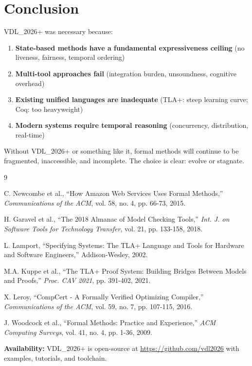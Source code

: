 \documentclass[11pt]{article}
\begin{document}
\section{Conclusion}

VDL\_2026+ was necessary because:

\begin{enumerate}
\item \textbf{State-based methods have a fundamental expressiveness ceiling} (no liveness, fairness, temporal ordering)
\item \textbf{Multi-tool approaches fail} (integration burden, unsoundness, cognitive overhead)
\item \textbf{Existing unified languages are inadequate} (TLA+: steep learning curve; Coq: too heavyweight)
\item \textbf{Modern systems require temporal reasoning} (concurrency, distribution, real-time)
\end{enumerate}

Without VDL\_2026+ or something like it, formal methods will continue to be fragmented, inaccessible, and incomplete. The choice is clear: evolve or stagnate.

\begin{thebibliography}{9}

C. Newcombe et al., ``How Amazon Web Services Uses Formal Methods,'' \textit{Communications of the ACM}, vol. 58, no. 4, pp. 66-73, 2015.

H. Garavel et al., ``The 2018 Almanac of Model Checking Tools,'' \textit{Int. J. on Software Tools for Technology Transfer}, vol. 21, pp. 133-158, 2018.

L. Lamport, ``Specifying Systems: The TLA+ Language and Tools for Hardware and Software Engineers,'' Addison-Wesley, 2002.

M.A. Kuppe et al., ``The TLA+ Proof System: Building Bridges Between Models and Proofs,'' \textit{Proc. CAV 2021}, pp. 391-402, 2021.

X. Leroy, ``CompCert - A Formally Verified Optimizing Compiler,'' \textit{Communications of the ACM}, vol. 59, no. 7, pp. 107-115, 2016.

J. Woodcock et al., ``Formal Methods: Practice and Experience,'' \textit{ACM Computing Surveys}, vol. 41, no. 4, pp. 1-36, 2009.

\end{thebibliography}

\vspace{1em}
\noindent\textbf{Availability:} VDL\_2026+ is open-source at \url{https://github.com/vdl2026} with examples, tutorials, and toolchain.
\end{document}
